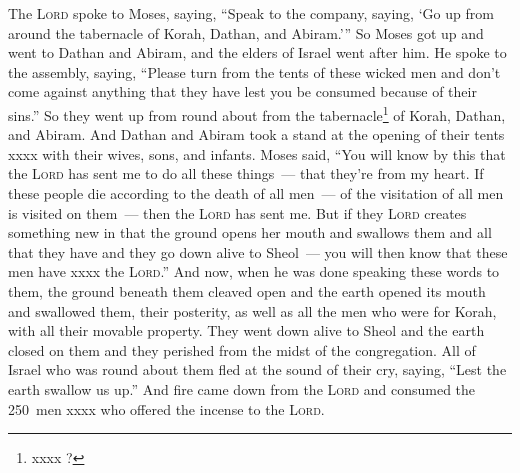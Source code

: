 \begin{inparaenum}
     The \textsc{Lord} spoke to Moses, saying,%
     ``Speak to the company, saying, `Go up from around the tabernacle of Korah, Dathan, and Abiram.'\thinspace''%
     So Moses got up and went to Dathan and Abiram, and the elders of Israel went after him.%
     He spoke to the assembly, saying, ``Please turn from the tents of these wicked men and don't come against anything that they have lest you be consumed because of their sins.''%
     So they went up from round about from the tabernacle\footnote{xxxx ?} of Korah, Dathan, and Abiram. And Dathan and Abiram took a stand at the opening of their tents xxxx with their wives, sons, and infants.%
     Moses said, ``You will know by this that the \textsc{Lord} has sent me to do all these things~--- that they're from my heart.%
     If these people die according to the death of all men~--- of the visitation of all men is visited on them~--- then the \textsc{Lord} has sent me.%
     But if they \textsc{Lord} creates something new in that the ground opens her mouth and swallows them and all that they have and they go down alive to Sheol~--- you will then know that these men have xxxx the \textsc{Lord}.''%
     And now, when he was done speaking these words to them, the ground beneath them cleaved open\understood%
     and the earth opened its mouth and swallowed them, their posterity, as well as all the men who were for Korah, with all their movable property.%
     They went down alive to Sheol and the earth closed on them and they perished from the midst of the congregation.%
     All of Israel who was round about them fled at the sound of their cry, saying, ``Lest the earth swallow us up.''%
     And fire came down from the \textsc{Lord} and consumed the 250~men xxxx who offered the incense to the \textsc{Lord}.%
\end{inparaenum}
